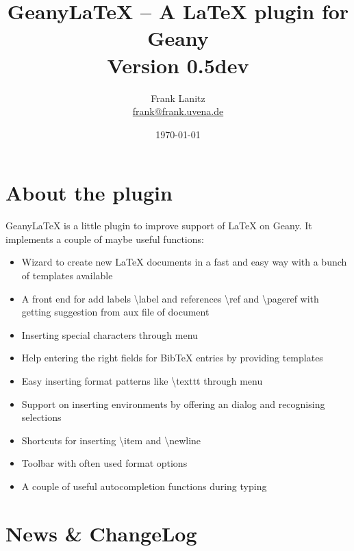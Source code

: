 \documentclass[%
paper=a4,%
fontsize=11pt,%
twoside=false,%
DIV18,
headsepline,
plainheadsepline,
footsepline,
plainfootsepline,
bibliography=totoc,%
listof=totoc,%
BCOR10mm,%
parskip=half,%
openany,%
]{scrartcl}
\title{Geany\LaTeX{} -- A \LaTeX{} plugin for Geany \\[1.5ex]
	   \normalsize Version 0.5dev}
\author{Frank Lanitz \\ \small{\href{mailto:frank@frank.uvena.de}{frank@frank.uvena.de}}}
\date{\today}
\begin{document}
\dedication{\normalsize \textbf{Note:} Please note the document has been created on
\today. If you are using devel version from SVN, please compile and check
\texttt{doc/geanylatex.tex} from sources. Please check page \pageref
{sec:compiling_of_documentation}, section \ref{sec:compiling_of_documentation} how to do so. }

\maketitle
\tableofcontents
\listoftables
\listoffigures
\newpage
{}
\section{About the plugin}

Geany\LaTeX{} is a little plugin to improve support of \LaTeX{} on Geany.
It implements a couple of maybe useful functions:

\begin{itemize}
	\item Wizard to create new \LaTeX{} documents in a fast and easy way
	 	  with a bunch of templates available
	\item A front end for add labels \textbackslash label{} and
		  references \textbackslash ref{} and \textbackslash pageref{}
   		  with getting suggestion from aux file of document
	\item Inserting special characters through menu
	\item Help entering the right fields for BibTeX entries by
		  providing templates
	\item Easy inserting format patterns like \textbackslash texttt{}
		  through menu
	\item Support on inserting environments by offering an dialog and
		  recognising selections
	\item Shortcuts for inserting \textbackslash item and
		  \textbackslash newline
	\item Toolbar with often used format options
	\item A couple of useful autocompletion functions during typing
\end{itemize}

\newpage
\section{News \& ChangeLog}
\end{document}
